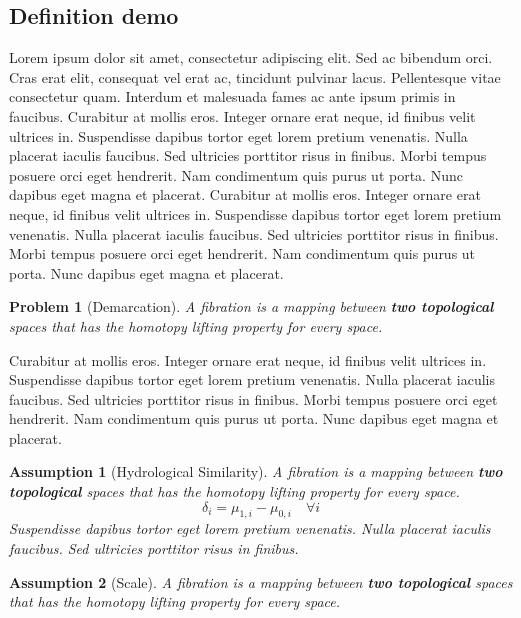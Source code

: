 \documentclass[11pt, a4paper]{report}
\newtheorem{problem}{Problem}
\newtheorem{assumption}{Assumption}[section]
\begin{document}
\subsection{Definition demo}

\par Lorem ipsum dolor sit amet, consectetur adipiscing elit. Sed ac bibendum orci. Cras erat elit, consequat vel erat ac, tincidunt pulvinar lacus. Pellentesque vitae consectetur quam. Interdum et malesuada fames ac ante ipsum primis in faucibus. Curabitur at mollis eros. Integer ornare erat neque, id finibus velit ultrices in. Suspendisse dapibus tortor eget lorem pretium venenatis. Nulla placerat iaculis faucibus. Sed ultricies porttitor risus in finibus. Morbi tempus posuere orci eget hendrerit. Nam condimentum quis purus ut porta. Nunc dapibus eget magna et placerat. Curabitur at mollis eros. Integer ornare erat neque, id finibus velit ultrices in. Suspendisse dapibus tortor eget lorem pretium venenatis. Nulla placerat iaculis faucibus. Sed ultricies porttitor risus in finibus. Morbi tempus posuere orci eget hendrerit. Nam condimentum quis purus ut porta. Nunc dapibus eget magna et placerat.

\begin{problem}[Demarcation]
A fibration is a mapping between \textbf{two topological} spaces that has the homotopy lifting property for every space.
\end{problem}

\par Curabitur at mollis eros. Integer ornare erat neque, id finibus velit ultrices in. Suspendisse dapibus tortor eget lorem pretium venenatis. Nulla placerat iaculis faucibus. Sed ultricies porttitor risus in finibus. Morbi tempus posuere orci eget hendrerit. Nam condimentum quis purus ut porta. Nunc dapibus eget magna et placerat.

\begin{assumption}[Hydrological Similarity]
A fibration is a mapping between \textbf{two topological} spaces that has the homotopy lifting property for every space.
\begin{equation*} %
		\delta_{i} = \mu_{1, i} - \mu_{0, i} \quad \forall i 
\end{equation*}
Suspendisse dapibus tortor eget lorem pretium venenatis. Nulla placerat iaculis faucibus. Sed ultricies porttitor risus in finibus.
\label{assump:01}
\end{assumption}

\begin{assumption}[Scale]
A fibration is a mapping between \textbf{two topological} spaces that has the homotopy lifting property for every space.
\end{assumption}
\end{document}
